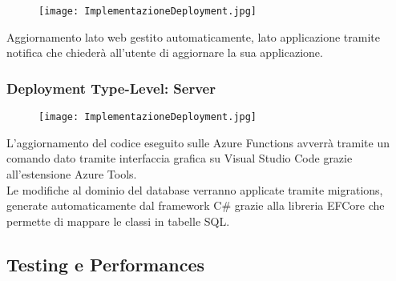 \begin{figure}[h!]
    \begin{center}
        \texttt{[image: ImplementazioneDeployment.jpg]}
    \end{center}
\end{figure}
Aggiornamento lato web gestito automaticamente, lato applicazione tramite notifica che chiederà all'utente di aggiornare la sua applicazione.\\
\newpage
\subsubsection{Deployment Type-Level: Server}

\begin{figure}[h!]
    \begin{center}
        \texttt{[image: ImplementazioneDeployment.jpg]}
    \end{center}
\end{figure}
L'aggiornamento del codice eseguito sulle Azure Functions avverrà tramite un comando dato tramite interfaccia grafica su Visual Studio Code grazie all'estensione Azure Tools.\\
Le modifiche al dominio del database verranno applicate tramite migrations, 
generate automaticamente dal framework C# grazie alla libreria EFCore che permette di mappare le classi in tabelle SQL.\\

\subsection{Testing e Performances}
